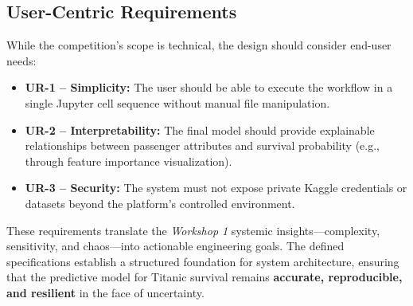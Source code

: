 \documentclass[12pt]{report}
\begin{document}
\subsection{User-Centric Requirements}

While the competition’s scope is technical, the design should consider end-user needs:

\begin{itemize}
    \item \textbf{UR-1 – Simplicity:} The user should be able to execute the workflow in a single Jupyter cell sequence without manual file manipulation.
    \item \textbf{UR-2 – Interpretability:} The final model should provide explainable relationships between passenger attributes and survival probability (e.g., through feature importance visualization).
    \item \textbf{UR-3 – Security:} The system must not expose private Kaggle credentials or datasets beyond the platform’s controlled environment.
\end{itemize}

\noindent
These requirements translate the \textit{Workshop 1} systemic insights—complexity, sensitivity, and chaos—into actionable engineering goals. The defined specifications establish a structured foundation for system architecture, ensuring that the predictive model for Titanic survival remains \textbf{accurate, reproducible, and resilient} in the face of uncertainty.
\end{document}
